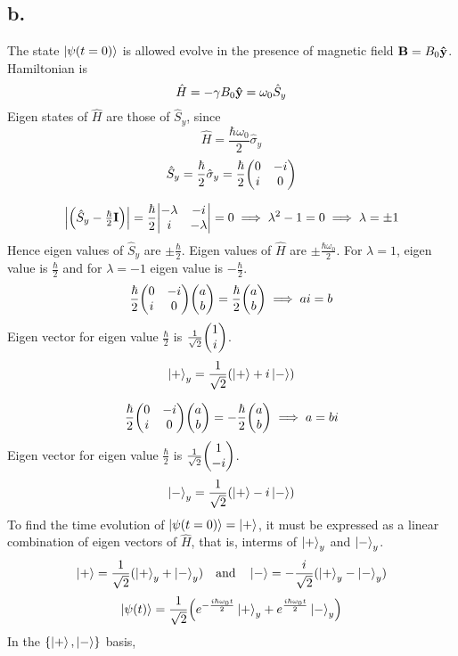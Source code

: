 \documentclass[12pt]{article}
\begin{document}
\subsection*{b.}
The state $\ket{\psi(t=0)}$ is allowed evolve in the presence of magnetic field $\vb{B}=B_0\vu{y}$. Hamiltonian is \[\hat{H}=-\gamma B_0\vu{y}=\omega_0\hat{S}_y\]
Eigen states of $\hat{H}$ are those of $\hat{S}_y$, since \[\hat{H}=\frac{\hbar\omega_0}{2}\hat{\sigma}_y\]
\[\hat{S}_y=\frac{\hbar}{2}\hat{\sigma}_y=\frac{\hbar}{2}\mqty(\pmat{2})\]

\[\mqty|\qty(\hat{S}_y-\frac{\hbar}{2}\vb{I})|=\frac{\hbar}{2}\mqty|\begin{matrix}-\lambda & -i \\ i& -\lambda\end{matrix}|=0\implies\lambda^2-1=0\implies\lambda=\pm 1\]
Hence eigen values of $\hat{S}_y$ are $\pm\frac{\hbar}{2}$. Eigen values of $\hat{H}$ are $\pm\frac{\hbar\omega_0}{2}$.
For $\lambda=1$, eigen value is $\frac{\hbar}{2}$ and for $\lambda=-1$ eigen value is $-\frac{\hbar}{2}$.
\[\frac{\hbar}{2}\mqty(\pmat{2})\mqty(\begin{matrix}a\\b\end{matrix})=\frac{\hbar}{2}\mqty(\begin{matrix}a\\b\end{matrix})\implies ai=b\]
Eigen vector for eigen value $\frac{\hbar}{2}$ is $\frac{1}{\sqrt{2}}\mqty(\begin{matrix}1\\i\end{matrix})$.
\[\ket{+}_y=\frac{1}{\sqrt{2}}\qty(\ket{+}+i\ket{-})\]

\[\frac{\hbar}{2}\mqty(\pmat{2})\mqty(\begin{matrix}a\\b\end{matrix})=-\frac{\hbar}{2}\mqty(\begin{matrix}a\\b\end{matrix})\implies a=bi\]
Eigen vector for eigen value $\frac{\hbar}{2}$ is $\frac{1}{\sqrt{2}}\mqty(\begin{matrix}1\\-i\end{matrix})$.
\[\ket{-}_y=\frac{1}{\sqrt{2}}\qty(\ket{+}-i\ket{-})\]
To find the time evolution of $\ket{\psi(t=0)}=\ket{+}$, it must be expressed as a linear combination of eigen vectors of $\hat{H}$, that is, interms of $\ket{+}_y$ and $\ket{-}_y$.
\[\ket{+}=\frac{1}{\sqrt{2}}(\ket{+}_y+\ket{-}_y)\qq{and}\ket{-}=-\frac{i}{\sqrt{2}}(\ket{+}_y-\ket{-}_y)\]
\[\ket{\psi(t)}=\frac{1}{\sqrt{2}}\qty(e^{-\frac{i\hbar\omega_0 t}{2}}\ket{+}_y+e^{\frac{i\hbar\omega_0 t}{2}}\ket{-}_y)\]
In the $\{\ket{+},\ket{-}\}$ basis, 
\end{document}
